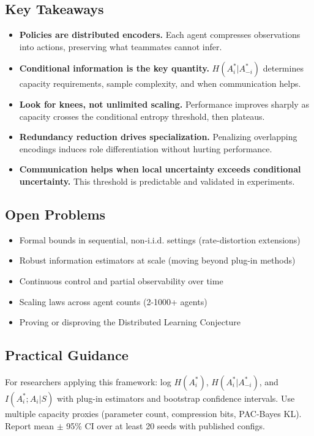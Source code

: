 \documentclass[10pt, letterpaper]{article}
\begin{document}
\subsection*{Key Takeaways}
\begin{itemize}
    \item \textbf{Policies are distributed encoders.} Each agent compresses observations into actions, preserving what teammates cannot infer.
    \item \textbf{Conditional information is the key quantity.} $H(A_i^*|A_{-i}^*)$ determines capacity requirements, sample complexity, and when communication helps.
    \item \textbf{Look for knees, not unlimited scaling.} Performance improves sharply as capacity crosses the conditional entropy threshold, then plateaus.
    \item \textbf{Redundancy reduction drives specialization.} Penalizing overlapping encodings induces role differentiation without hurting performance.
    \item \textbf{Communication helps when local uncertainty exceeds conditional uncertainty.} This threshold is predictable and validated in experiments.
\end{itemize}

\subsection*{Open Problems}
\begin{itemize}
    \item Formal bounds in sequential, non-i.i.d. settings (rate-distortion extensions)
    \item Robust information estimators at scale (moving beyond plug-in methods)
    \item Continuous control and partial observability over time
    \item Scaling laws across agent counts (2-1000+ agents)
    \item Proving or disproving the Distributed Learning Conjecture
\end{itemize}

\subsection*{Practical Guidance}

For researchers applying this framework: log $H(A_i^*)$, $H(A_i^*|A_{-i}^*)$, and $I(A_i^*; A_i|S)$ with plug-in estimators and bootstrap confidence intervals. Use multiple capacity proxies (parameter count, compression bits, PAC-Bayes KL). Report mean $\pm$ 95\% CI over at least 20 seeds with published configs.
\end{document}
